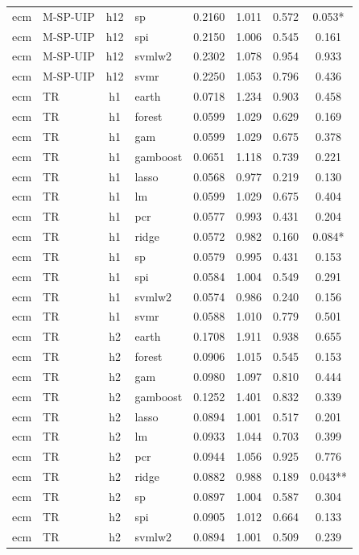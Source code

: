 \begin{ThreePartTable}
\begin{longtable}[t]{llclcccc}
ecm & M-SP-UIP & h12 & sp & 0.2160 & 1.011 & 0.572 & 0.053*\\
ecm & M-SP-UIP & h12 & spi & 0.2150 & 1.006 & 0.545 & 0.161\\
ecm & M-SP-UIP & h12 & svmlw2 & 0.2302 & 1.078 & 0.954 & 0.933\\
ecm & M-SP-UIP & h12 & svmr & 0.2250 & 1.053 & 0.796 & 0.436\\
\addlinespace
ecm & TR & h1 & earth & 0.0718 & 1.234 & 0.903 & 0.458\\
ecm & TR & h1 & forest & 0.0599 & 1.029 & 0.629 & 0.169\\
ecm & TR & h1 & gam & 0.0599 & 1.029 & 0.675 & 0.378\\
ecm & TR & h1 & gamboost & 0.0651 & 1.118 & 0.739 & 0.221\\
ecm & TR & h1 & lasso & 0.0568 & 0.977 & 0.219 & 0.130\\
ecm & TR & h1 & lm & 0.0599 & 1.029 & 0.675 & 0.404\\
ecm & TR & h1 & pcr & 0.0577 & 0.993 & 0.431 & 0.204\\
ecm & TR & h1 & ridge & 0.0572 & 0.982 & 0.160 & 0.084*\\
ecm & TR & h1 & sp & 0.0579 & 0.995 & 0.431 & 0.153\\
ecm & TR & h1 & spi & 0.0584 & 1.004 & 0.549 & 0.291\\
ecm & TR & h1 & svmlw2 & 0.0574 & 0.986 & 0.240 & 0.156\\
ecm & TR & h1 & svmr & 0.0588 & 1.010 & 0.779 & 0.501\\
\addlinespace
ecm & TR & h2 & earth & 0.1708 & 1.911 & 0.938 & 0.655\\
ecm & TR & h2 & forest & 0.0906 & 1.015 & 0.545 & 0.153\\
ecm & TR & h2 & gam & 0.0980 & 1.097 & 0.810 & 0.444\\
ecm & TR & h2 & gamboost & 0.1252 & 1.401 & 0.832 & 0.339\\
ecm & TR & h2 & lasso & 0.0894 & 1.001 & 0.517 & 0.201\\
ecm & TR & h2 & lm & 0.0933 & 1.044 & 0.703 & 0.399\\
ecm & TR & h2 & pcr & 0.0944 & 1.056 & 0.925 & 0.776\\
ecm & TR & h2 & ridge & 0.0882 & 0.988 & 0.189 & 0.043**\\
ecm & TR & h2 & sp & 0.0897 & 1.004 & 0.587 & 0.304\\
ecm & TR & h2 & spi & 0.0905 & 1.012 & 0.664 & 0.133\\
ecm & TR & h2 & svmlw2 & 0.0894 & 1.001 & 0.509 & 0.239\\

\end{longtable}
\end{ThreePartTable}
